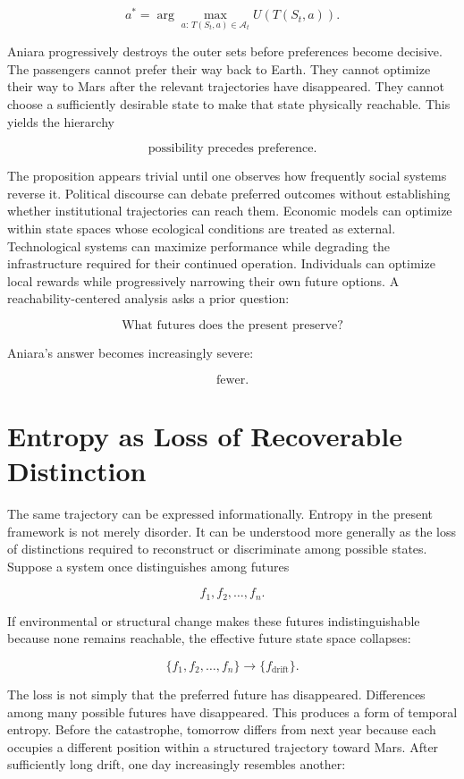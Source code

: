 \documentclass[11pt,oneside]{book}
\theoremstyle{definition}
\theoremstyle{remark}
\begin{document}
\[
a^* = \arg\max_{a:\,T(S_t,a)\in\mathcal{A}_t} U\!\left(T(S_t,a)\right).
\]

Aniara progressively destroys the outer sets before preferences become decisive. The passengers
cannot prefer their way back to Earth. They cannot optimize their way to Mars after the relevant
trajectories have disappeared. They cannot choose a sufficiently desirable state to make that state
physically reachable. This yields the hierarchy

\[
\boxed{ \text{possibility precedes preference}. }
\]

The proposition appears trivial until one observes how frequently social systems reverse it.
Political discourse can debate preferred outcomes without establishing whether institutional
trajectories can reach them. Economic models can optimize within state spaces whose ecological
conditions are treated as external. Technological systems can maximize performance while degrading
the infrastructure required for their continued operation. Individuals can optimize local rewards
while progressively narrowing their own future options. A reachability-centered analysis asks a
prior question:

\[
\text{What futures does the present preserve?}
\]

Aniara's answer becomes increasingly severe:

\[
\text{fewer}.
\]

\section{Entropy as Loss of Recoverable Distinction}

The same trajectory can be expressed informationally. Entropy in the present framework is not merely
disorder. It can be understood more generally as the loss of distinctions required to reconstruct or
discriminate among possible states. Suppose a system once distinguishes among futures

\[
f_1,f_2,\ldots,f_n.
\]

If environmental or structural change makes these futures indistinguishable because none remains
reachable, the effective future state space collapses:

\[
\{f_1,f_2,\ldots,f_n\} \rightarrow \{f_{\mathrm{drift}}\}.
\]

The loss is not simply that the preferred future has disappeared. Differences among many possible
futures have disappeared. This produces a form of temporal entropy. Before the catastrophe, tomorrow
differs from next year because each occupies a different position within a structured trajectory
toward Mars. After sufficiently long drift, one day increasingly resembles another:
\end{document}
